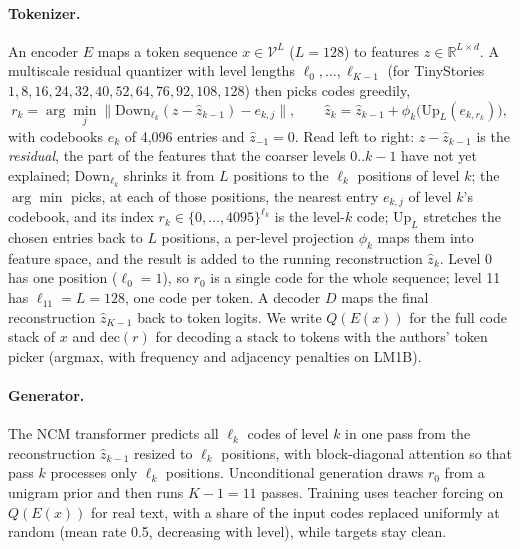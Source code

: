 \documentclass[10pt]{article}
\begin{document}
\paragraph{Tokenizer.} An encoder $E$ maps a token sequence $x \in \mathcal{V}^{L}$ ($L{=}128$) to features $z \in \mathbb{R}^{L\times d}$. A multiscale residual quantizer with level lengths $\ell_0,\dots,\ell_{K-1}$ (for TinyStories $1,8,16,24,32,40,52,64,76,92,108,128$) then picks codes greedily,
\begin{equation}
r_k = \arg\min_{j} \big\| \mathrm{Down}_{\ell_k}(z - \hat z_{k-1}) - e_{k,j} \big\|, \qquad \hat z_k = \hat z_{k-1} + \phi_k\!\big(\mathrm{Up}_L(e_{k,r_k})\big),
\label{eq:rq}
\end{equation}
with codebooks $e_k$ of 4{,}096 entries and $\hat z_{-1}{=}0$. Read left to right: $z - \hat z_{k-1}$ is the \emph{residual}, the part of the features that the coarser levels $0..k{-}1$ have not yet explained; $\mathrm{Down}_{\ell_k}$ shrinks it from $L$ positions to the $\ell_k$ positions of level $k$; the $\arg\min$ picks, at each of those positions, the nearest entry $e_{k,j}$ of level $k$'s codebook, and its index $r_k \in \{0,\dots,4095\}^{\ell_k}$ is the level-$k$ code; $\mathrm{Up}_L$ stretches the chosen entries back to $L$ positions, a per-level projection $\phi_k$ maps them into feature space, and the result is added to the running reconstruction $\hat z_k$. Level 0 has one position ($\ell_0{=}1$), so $r_0$ is a single code for the whole sequence; level 11 has $\ell_{11}{=}L{=}128$, one code per token. A decoder $D$ maps the final reconstruction $\hat z_{K-1}$ back to token logits. We write $Q(E(x))$ for the full code stack of $x$ and $\mathrm{dec}(r)$ for decoding a stack to tokens with the authors' token picker (argmax, with frequency and adjacency penalties on LM1B).

\paragraph{Generator.} The NCM transformer predicts all $\ell_k$ codes of level $k$ in one pass from the reconstruction $\hat z_{k-1}$ resized to $\ell_k$ positions, with block-diagonal attention so that pass $k$ processes only $\ell_k$ positions. Unconditional generation draws $r_0$ from a unigram prior and then runs $K{-}1{=}11$ passes. Training uses teacher forcing on $Q(E(x))$ for real text, with a share of the input codes replaced uniformly at random (mean rate 0.5, decreasing with level), while targets stay clean.
\end{document}
